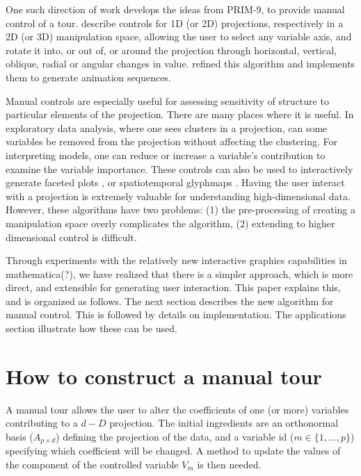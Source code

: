 \documentclass[]{interact}
\theoremstyle{plain}%
\theoremstyle{definition}
\theoremstyle{remark}
\begin{document}
One such direction of work develops the ideas from PRIM-9, to provide
manual control of a tour. \citet{cook_manual_1997} describe controls for
1D (or 2D) projections, respectively in a 2D (or 3D) manipulation space,
allowing the user to select any variable axis, and rotate it into, or
out of, or around the projection through horizontal, vertical, oblique,
radial or angular changes in value. \citet{spyrison_spinifex_2020}
refined this algorithm and implements them to generate animation
sequences.

Manual controls are especially useful for assessing sensitivity of
structure to particular elements of the projection. There are many
places where it is useful. In exploratory data analysis, where one sees
clusters in a projection, can some variables be removed from the
projection without affecting the clustering. For interpreting models,
one can reduce or increase a variable's contribution to examine the
variable importance. These controls can also be used to interactively
generate faceted plots \citep{XXX}, or spatiotemporal glyphmaps
\citep{XXX}. Having the user interact with a projection is extremely
valuable for understanding high-dimensional data. However, these
algorithms have two problems: (1) the pre-processing of creating a
manipulation space overly complicates the algorithm, (2) extending to
higher dimensional control is difficult.

Through experiments with the relatively new interactive graphics
capabilities in mathematica(?), we have realized that there is a simpler
approach, which is more direct, and extensible for generating user
interaction. This paper explains this, and is organized as follows. The
next section describes the new algorithm for manual control. This is
followed by details on implementation. The applications section
illustrate how these can be used.

\hypertarget{sec:method}{%
\section{How to construct a manual tour}\label{sec:method}}

A manual tour allows the user to alter the coefficients of one (or more)
variables contributing to a \(d-D\) projection. The initial ingredients
are an orthonormal basis (\(A_{p\times d}\)) defining the projection of
the data, and a variable id (\(m \in \{1, ..., p\}\)) specifying which
coefficient will be changed. A method to update the values of the
component of the controlled variable \(V_m\) is then needed.
\end{document}
